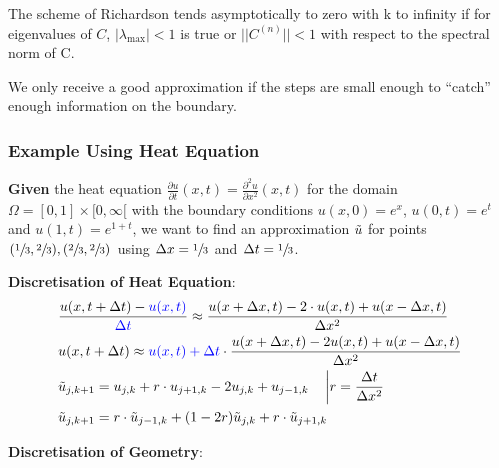 The scheme of Richardson tends asymptotically to zero with k to infinity if
for eigenvalues of $C$, $|\lambda_\mathrm{max}|<1$ is true or $||C^{(n)}||<1$ with respect to the spectral norm of C.

We only receive a good approximation if the steps are small enough to ``catch'' enough information on the boundary.

\subsubsection{Example Using Heat Equation}

\textbf{Given} the heat equation $\frac{\partial u}{\partial t}(x,t) = \frac{\partial^2 u}{\partial x^2}(x,t)$
for the domain $\Omega = [0,1]\times [0, \infty[$ with the boundary conditions
$u(x,0) = e^x$, $u(0,t) = e^t$ and $u(1,t) = e^{1+t}$, we want to find an approximation $\tilde{u}$ for points
$(\sfrac{1}{3},\sfrac{2}{3}),(\sfrac{2}{3},\sfrac{2}{3})$ using $\Delta x = \sfrac{1}{3}$ and $\Delta t = \sfrac{1}{3}$.

\textbf{Discretisation of Heat Equation}:
\begin{align*}
	& \frac{u(x,t+\Delta t)-{\color{blue} u(x,t)}}{\color{blue}\Delta t}\approx\frac{u(x+\Delta x,t)-2\cdot u(x,t)+u(x-\Delta x,t)}{\Delta x^{2}} \\
	& u(x,t+\Delta t)\approx {\color{blue}u(x,t)+\Delta t}\cdot{\frac{u(x+\Delta x,t)-2 u(x,t)+u(x-\Delta x,t)}{\Delta x^{2}}} \\
	& \tilde{u}_{j,k+1}=u_{j,k}+r\cdot u_{j+1,k} - 2u_{j,k} + u_{j-1,k}\quad \left|r=\frac{\Delta t}{\Delta x^2}\right. \\
	& \tilde{u}_{j,k+1} = r\cdot\tilde{u}_{j-1,k}+(1-2r)\tilde{u}_{j,k} + r\cdot\tilde{u}_{j+1,k}
\end{align*}

\textbf{Discretisation of Geometry}:


